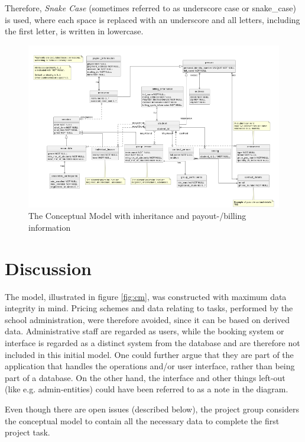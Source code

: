 \documentclass[a4paper]{scrartcl}
\begin{document}
Therefore, \emph{Snake Case}
(sometimes referred to as underscore case or 
 snake\_case)
is used, where each space is replaced with an underscore
and all letters, including the first letter, is written in lowercase. 

\begin{figure}[h!]
  \begin{center}
    \includegraphics[width=\textwidth]{figures/i_model.png}
    \caption{The Conceptual Model with inheritance and payout-/billing information}
    \label{fig:cm_i}
  \end{center}
\end{figure}

\section{Discussion}
The model, illustrated in figure \ref{fig:cm}, was constructed with maximum
data integrity in mind.
Pricing schemes and data relating to tasks, performed by the school
administration, were therefore avoided, since it can be based on derived data.
Administrative staff are regarded as users, while the booking system or
interface is regarded as a distinct system from the database and are therefore
not included in this initial model. One could further argue that they are part
of the application that handles the operations and/or user interface, rather
than being part of a database.  
On the other hand, the interface and other things left-out (like e.g.
admin-entities) could have been referred to as a note in the diagram.  

Even though there are open issues (described below), the project group considers
the conceptual model to contain all the necessary data to complete the first
project task.  
\end{document}
